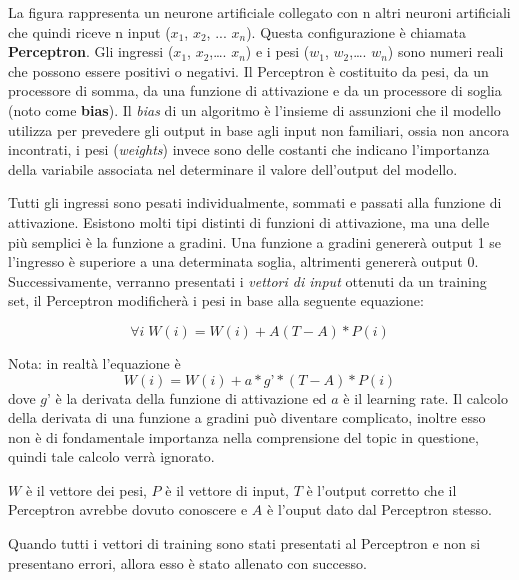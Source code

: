 La figura rappresenta un neurone artificiale collegato con n altri neuroni artificiali che quindi riceve n input ($x_1$, $x_2$, ... $x_n$). Questa configurazione è chiamata \textbf{Perceptron}.
Gli ingressi ($x_1$, $x_2$,…. $x_n$) e i pesi ($w_1$, $w_2$,…. $w_n$) sono numeri reali che possono essere positivi o negativi.
Il Perceptron è costituito da pesi, da un processore di somma, da una funzione di attivazione e da un processore di soglia (noto come \textbf{bias}).
Il \textit{bias} di un algoritmo è l'insieme di assunzioni che il modello utilizza per prevedere gli output in base agli input non familiari, ossia non ancora incontrati, i pesi (\textit{weights}) invece sono delle costanti che indicano l'importanza della variabile associata nel determinare il valore dell'output del modello.

Tutti gli ingressi sono pesati individualmente, sommati e passati alla funzione di attivazione. Esistono molti tipi distinti di funzioni di attivazione, ma una delle più semplici è la funzione a gradini. Una funzione a gradini genererà output 1 se l'ingresso è superiore a una determinata soglia, altrimenti genererà output 0.
\newpage
Successivamente, verranno presentati i \textit{vettori di input} ottenuti da un training set, il Perceptron modificherà i pesi in base alla seguente equazione:


$$ \forall i \; W(i) = W(i) + A(T-A)*P(i) $$ 

Nota: in realtà l'equazione è 
$$W(i) = W(i) + a*g’*(T-A)*P(i)$$
dove $g’$ è la derivata della funzione di attivazione ed $a$ è il learning rate.
Il calcolo della derivata di una funzione a gradini può diventare complicato, inoltre esso non è di fondamentale importanza nella comprensione del topic in questione, quindi tale calcolo verrà ignorato.

$W$ è il vettore dei pesi, $P$ è il vettore di input, $T$ è l'output corretto che il Perceptron avrebbe dovuto conoscere e $A$ è l'ouput dato dal Perceptron stesso.

Quando tutti i vettori di training sono stati presentati al Perceptron e non si presentano errori, allora esso è stato allenato con successo.\newpage

